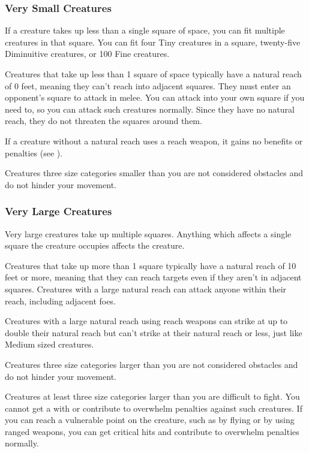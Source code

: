         \subsubsection{Very Small Creatures}
             If a creature takes up less than a single square of space, you can fit multiple creatures in that square. You can fit four Tiny creatures in a square, twenty-five Diminuitive creatures, or 100 Fine creatures.

             Creatures that take up less than 1 square of space typically have a natural reach of 0 feet, meaning they can't reach into adjacent squares. They must enter an opponent's square to attack in melee. You can attack into your own square if you need to, so you can attack such creatures normally. Since they have no natural reach, they do not threaten the squares around them.

            If a creature without a natural reach uses a reach weapon, it gains no benefits or penalties (see ).

             Creatures three size categories smaller than you are not considered obstacles and do not hinder your movement.

        \subsubsection{Very Large Creatures}
             Very large creatures take up multiple squares. Anything which affects a single square the creature occupies affects the creature.

             Creatures that take up more than 1 square typically have a natural reach of 10 feet or more, meaning that they can reach targets even if they aren't in adjacent squares. Creatures with a large natural reach can attack anyone within their reach, including adjacent foes.

            Creatures with a large natural reach using reach weapons can strike at up to double their natural reach but can't strike at their natural reach or less, just like Medium sized creatures.

             Creatures three size categories larger than you are not considered obstacles and do not hinder your movement.

             Creatures at least three size categories larger than you are difficult to fight. You cannot get a  with  or contribute to overwhelm penalties against such creatures. If you can reach a vulnerable point on the creature, such as by flying or by using ranged weapons, you can get critical hits and contribute to overwhelm penalties normally.

